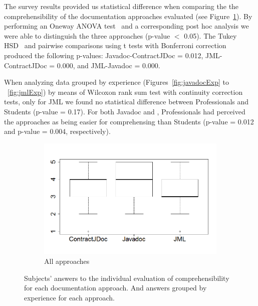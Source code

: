 The survey results provided us statistical difference when comparing the the
comprehensibility of the documentation approaches evaluated (see
Figure~\ref{fig:allApproaches}). By performing an Oneway ANOVA test~\cite{statistical} and
a corresponding post hoc analysis we were able to distinguish the three
approaches (p-value $<$ 0.05).
The Tukey HSD~\cite{statistical} and pairwise comparisons using t tests
with Bonferroni correction~\cite{statistical} produced the following p-values:
Javadoc-ContractJDoc = 0.012, JML-ContractJDoc = 0.000, and JML-Javadoc = 0.000.


When analyzing data grouped by experience (Figures~\ref{fig:javadocExp} to
~\ref{fig:jmlExp}) by means of Wilcoxon rank sum test with continuity correction
tests, only for JML we found no statistical difference between Professionals and
Students (p-value = 0.17). For both Javadoc and \contractjdoc{}, Professionals
had perceived the approaches as being easier for comprehensing than Students
(p-value = 0.012 and p-value = 0.004, respectively).






\begin{figure}
\centering
\begin{subfigure}{.48\textwidth}
\includegraphics[width=1\linewidth]{figs/boxplotApproachesSurveyStudy}
\caption{All approaches}
\label{fig:allApproaches}
\end{subfigure}

\caption{Subjects' answers to the individual evaluation of comprehensibility for
each documentation approach. And answers grouped by experience for each
approach.}
\label{fig:surveyResults}
\end{figure}



